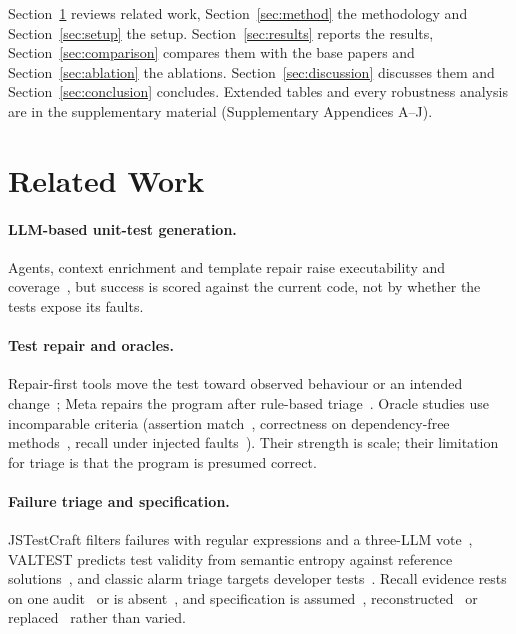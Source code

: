 \documentclass[journal]{IEEEtran}
\begin{document}
Section~\ref{sec:related} reviews related work, Section~\ref{sec:method} the methodology and Section~\ref{sec:setup} the setup. Section~\ref{sec:results} reports the results, Section~\ref{sec:comparison} compares them with the base papers and Section~\ref{sec:ablation} the ablations. Section~\ref{sec:discussion} discusses them and Section~\ref{sec:conclusion} concludes. Extended tables and every robustness analysis are in the supplementary material (Supplementary Appendices A--J).

\section{Related Work}\label{sec:related}

\paragraph{LLM-based unit-test generation.} Agents, context enrichment and template repair raise executability and coverage~\cite{xie2026maco,liu2026jstestcraft,gu2026testart,walczak2026context}, but success is scored against the current code, not by whether the tests expose its faults.

\paragraph{Test repair and oracles.} Repair-first tools move the test toward observed behaviour or an intended change~\cite{gu2026testart,hayet2025chatassert,yaraghi2025target}; Meta repairs the program after rule-based triage~\cite{maddila2026agentic}. Oracle studies use incomparable criteria (assertion match~\cite{hayet2025chatassert}, correctness on dependency-free methods~\cite{xu2026candor}, recall under injected faults~\cite{li2026mitgen}). Their strength is scale; their limitation for triage is that the program is presumed correct.

\paragraph{Failure triage and specification.} JSTestCraft filters failures with regular expressions and a three-LLM vote~\cite{liu2026jstestcraft}, VALTEST predicts test validity from semantic entropy against reference solutions~\cite{taherkhani2026valtest}, and classic alarm triage targets developer tests~\cite{herzig2015alarms,jiang2017alarm}. Recall evidence rests on one audit~\cite{liu2026jstestcraft} or is absent~\cite{fu2026javaoracle}, and specification is assumed~\cite{xu2026candor}, reconstructed~\cite{li2026mitgen} or replaced~\cite{zhao2026misguidance} rather than varied.
\end{document}
